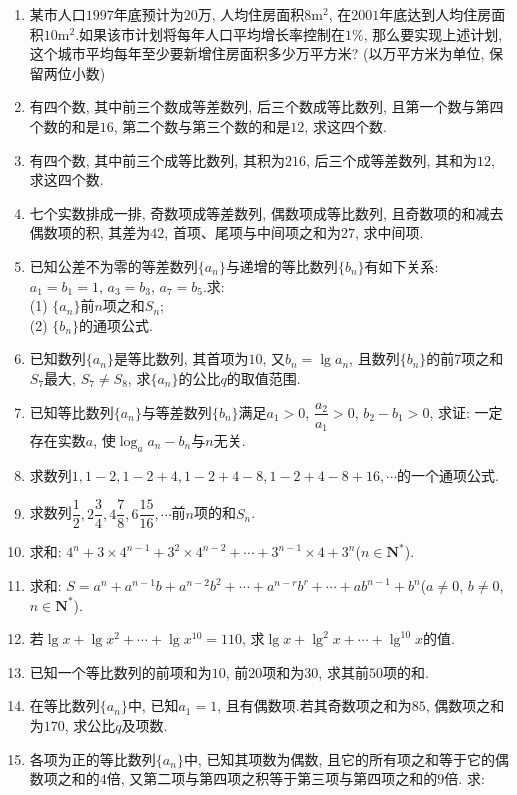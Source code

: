 \documentclass[10pt,a4paper]{article}
\begin{document}
\begin{enumerate}[1.]
\item 某市人口$1997$年底预计为$20$万, 人均住房面积$8\text{m}^2$, 在$2001$年底达到人均住房面积$10\text{m}^2$.如果该市计划将每年人口平均增长率控制在$1\%$, 那么要实现上述计划, 这个城市平均每年至少要新增住房面积多少万平方米? (以万平方米为单位, 保留两位小数)
\item 有四个数, 其中前三个数成等差数列, 后三个数成等比数列, 且第一个数与第四个数的和是$16$, 第二个数与第三个数的和是$12$, 求这四个数.
\item 有四个数, 其中前三个成等比数列, 其积为$216$, 后三个成等差数列, 其和为$12$, 求这四个数.
\item 七个实数排成一排, 奇数项成等差数列, 偶数项成等比数列, 且奇数项的和减去偶数项的积, 其差为$42$, 首项、尾项与中间项之和为$27$, 求中间项.
\item 已知公差不为零的等差数列$\{a_n\}$与递增的等比数列$\{b_n\}$有如下关系: $a_1=b_1=1$, $a_3=b_3$, $a_7=b_5$.求:\\
(1) $\{a_n\}$前$n$项之和$S_n$;\\
(2) $\{b_n\}$的通项公式.
\item 已知数列$\{a_n\}$是等比数列, 其首项为$10$, 又$b_n=\lg a_n$, 且数列$\{b_n\}$的前$7$项之和$S_7$最大, $S_7\ne S_8$, 求$\{a_n\}$的公比$q$的取值范围.
\item 已知等比数列$\{a_n\}$与等差数列$\{b_n\}$满足$a_1>0$, $\dfrac{a_2}{a_1}>0$, $b_2-b_1>0$, 求证: 一定存在实数$a$, 使$\log _aa_n-b_n$与$n$无关.
\item 求数列$1,1-2,1-2+4,1-2+4-8,1-2+4-8+16,\cdots$的一个通项公式.
\item 求数列$\dfrac 12,2\dfrac 34,4\dfrac 78,6\dfrac{15}{16},\cdots$前$n$项的和$S_n$.
\item 求和: $4^n+3\times 4^{n-1}+3^2\times 4^{n-2}+\cdots +3^{n-1}\times 4+3^n$($n\in \mathbf{N}^*$).
\item 求和: $S=a^n+a^{n-1}b+a^{n-2}b^2+\cdots +a^{n-r}b^r+\cdots +ab^{n-1}+b^n$($a\ne 0$, $b\ne 0$, $n\in \mathbf{N}^*$).
\item 若$\lg x+\lg x^2+\cdots +\lg x^{10}=110$, 求$\lg x+\lg ^2x+\cdots +\lg ^{10}x$的值.
\item 已知一个等比数列的前项和为$10$, 前$20$项和为$30$, 求其前$50$项的和.
\item 在等比数列$\{a_n\}$中, 已知$a_1=1$, 且有偶数项.若其奇数项之和为$85$, 偶数项之和为$170$, 求公比$q$及项数.
\item 各项为正的等比数列$\{a_n\}$中, 已知其项数为偶数, 且它的所有项之和等于它的偶数项之和的$4$倍, 又第二项与第四项之积等于第三项与第四项之和的$9$倍. 求:\\

\end{enumerate}
\end{document}
